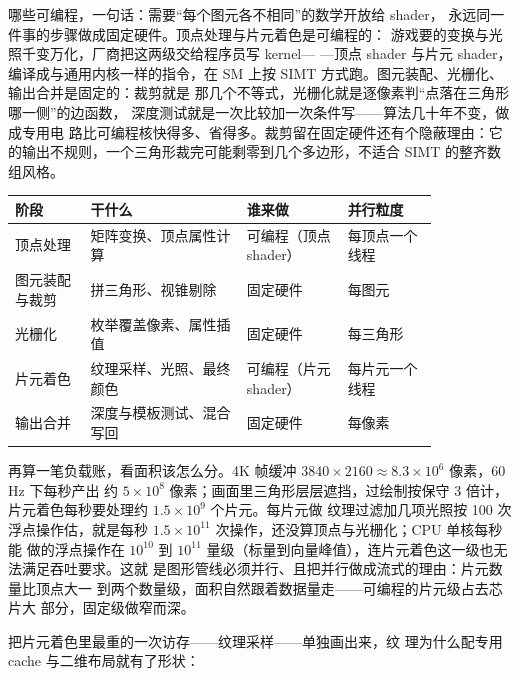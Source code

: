 哪些可编程，一句话：需要“每个图元各不相同”的数学开放给 shader，
永远同一件事的步骤做成固定硬件。顶点处理与片元着色是可编程的：
游戏要的变换与光照千变万化，厂商把这两级交给程序员写 kernel—
—顶点 shader 与片元 shader，编译成与通用内核一样的指令，在 SM
上按 SIMT 方式跑。图元装配、光栅化、输出合并是固定的：裁剪就是
那几个不等式，光栅化就是逐像素判“点落在三角形哪一侧”的边函数，
深度测试就是一次比较加一次条件写——算法几十年不变，做成专用电
路比可编程核快得多、省得多。裁剪留在固定硬件还有个隐蔽理由：它
的输出不规则，一个三角形裁完可能剩零到几个多边形，不适合 SIMT
的整齐数组风格。

\begin{longtable}{L{0.15\linewidth}L{0.31\linewidth}L{0.20\linewidth}L{0.18\linewidth}}
\toprule
阶段 & 干什么 & 谁来做 & 并行粒度 \\
\midrule
顶点处理 & 矩阵变换、顶点属性计算 & 可编程（顶点 shader） & 每顶点一个线程 \\\tablerowrule
图元装配与裁剪 & 拼三角形、视锥剔除 & 固定硬件 & 每图元 \\\tablerowrule
光栅化 & 枚举覆盖像素、属性插值 & 固定硬件 & 每三角形 \\\tablerowrule
片元着色 & 纹理采样、光照、最终颜色 & 可编程（片元 shader） & 每片元一个线程 \\\tablerowrule
输出合并 & 深度与模板测试、混合写回 & 固定硬件 & 每像素 \\
\bottomrule
\end{longtable}

再算一笔负载账，看面积该怎么分。4K 帧缓冲
$3840\times2160\approx8.3\times10^{6}$ 像素，60 Hz 下每秒产出
约 $5\times10^{8}$ 像素；画面里三角形层层遮挡，过绘制按保守 3
倍计，片元着色每秒要处理约 $1.5\times10^{9}$ 个片元。每片元做
纹理过滤加几项光照按 100 次浮点操作估，就是每秒
$1.5\times10^{11}$ 次操作，还没算顶点与光栅化；CPU 单核每秒能
做的浮点操作在 $10^{10}$ 到 $10^{11}$ 量级（标量到向量峰值），连片元着色这一级也无法满足吞吐要求。这就
是图形管线必须并行、且把并行做成流式的理由：片元数量比顶点大一
到两个数量级，面积自然跟着数据量走——可编程的片元级占去芯片大
部分，固定级做窄而深。

把片元着色里最重的一次访存——纹理采样——单独画出来，纹
理为什么配专用 cache 与二维布局就有了形状：

